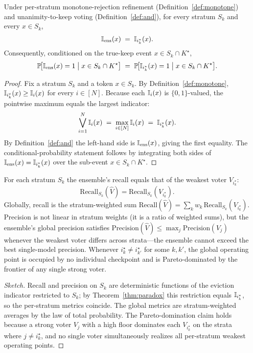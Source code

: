 \begin{theorem}
\label{thm:paradox}
Under per-stratum monotone-rejection refinement (Definition~\ref{def:monotone})
and unanimity-to-keep voting (Definition~\ref{def:and}), for every stratum
$S_k$ and every $x \in S_k$,
\[
  \mathbb{I}_{\mathrm{ens}}(x) \;=\; \mathbb{I}_{i^{\star}_k}(x).
\]
Consequently, conditioned on the true-keep event $x \in S_k \cap K^{\star}$,
\[
  \mathbb{P}\!\bigl[\mathbb{I}_{\mathrm{ens}}(x)=1 \;\big|\; x\in S_k\cap K^{\star}\bigr]
  \;=\;
  \mathbb{P}\!\bigl[\mathbb{I}_{i^{\star}_k}(x)=1 \;\big|\; x\in S_k\cap K^{\star}\bigr].
\]
\end{theorem}

\begin{proof}
Fix a stratum $S_k$ and a token $x \in S_k$. By
Definition~\ref{def:monotone}, $\mathbb{I}_{i^{\star}_k}(x) \ge \mathbb{I}_i(x)$ for every
$i \in [N]$. Because each $\mathbb{I}_i(x)$ is $\{0,1\}$-valued, the pointwise maximum
equals the largest indicator:
\[
  \bigvee_{i=1}^{N} \mathbb{I}_i(x)
  \;=\; \max_{i\in[N]} \mathbb{I}_i(x)
  \;=\; \mathbb{I}_{i^{\star}_k}(x).
\]
By Definition~\ref{def:and} the left-hand side is $\mathbb{I}_{\mathrm{ens}}(x)$,
giving the first equality. The conditional-probability statement follows by
integrating both sides of $\mathbb{I}_{\mathrm{ens}}(x)=\mathbb{I}_{i^{\star}_k}(x)$ over the
sub-event $x \in S_k \cap K^{\star}$.
\end{proof}

\begin{corollary}
\label{cor:pareto}
For each stratum $S_k$ the ensemble's recall equals that of the
weakest voter $V_{i^{\star}_k}$:
\[
  \mathrm{Recall}_{S_k}(\hat V)=\mathrm{Recall}_{S_k}(V_{i^{\star}_k}).
\]
Globally, recall is the stratum-weighted sum
$\mathrm{Recall}(\hat V) = \sum_k w_k\,\mathrm{Recall}_{S_k}(V_{i^{\star}_k})$.
Precision is not linear in stratum weights (it is a ratio of weighted sums),
but the ensemble's global precision satisfies
$\mathrm{Precision}(\hat V) \le \max_j \mathrm{Precision}(V_j)$
whenever the weakest voter differs across strata---the ensemble cannot
exceed the best single-model precision. Whenever $i^{\star}_k \neq
i^{\star}_{k'}$ for some $k,k'$, the global operating point is occupied by
no individual checkpoint and is Pareto-dominated by the frontier of any
single strong voter.
\end{corollary}

\begin{proof}[Sketch]
Recall and precision on $S_k$ are deterministic functions of the eviction
indicator restricted to $S_k$; by Theorem~\ref{thm:paradox} this restriction
equals $\mathbb{I}_{i^{\star}_k}$, so the per-stratum metrics coincide. The global
metrics are stratum-weighted averages by the law of total probability. The
Pareto-domination claim holds because a strong voter $V_j$ with a high floor
dominates each $V_{i^{\star}_k}$ on the strata where $j \neq i^{\star}_k$, and
no single voter simultaneously realizes all per-stratum weakest operating
points.
\end{proof}

